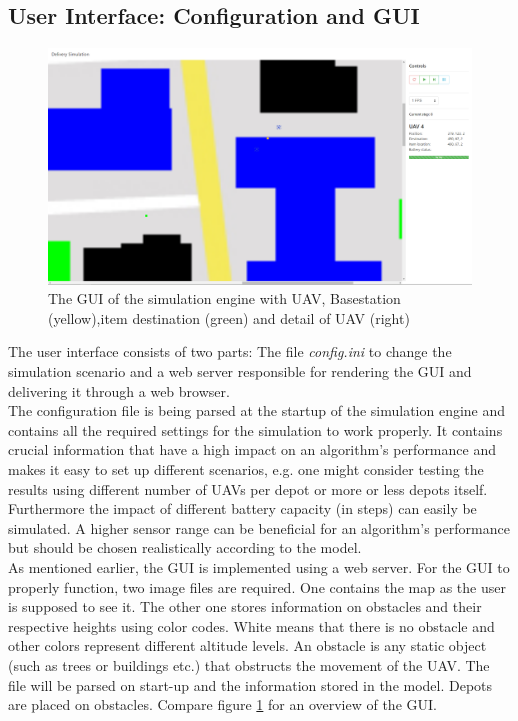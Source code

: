 \subsection{User Interface: Configuration and GUI}
\begin{figure}[htbp]\label{fig:gui}
	\centering
	\includegraphics[width=\textwidth]{images/gui}
	\caption{The GUI of the simulation engine with UAV, Basestation (yellow),item destination (green) and detail of UAV (right)}
\end{figure}
The user interface consists of two parts: The file \textit{config.ini} to change the simulation scenario and a web server responsible for rendering the GUI and delivering it through a web browser.\\
The configuration file is being parsed at the startup of the simulation engine and contains all the required settings for the simulation to work properly. It contains crucial information that have a high impact on an algorithm's performance and makes it easy to set up different scenarios, e.g. one might consider testing the results using different number of UAVs per depot or more or less depots itself.
Furthermore the impact of different battery capacity (in steps) can easily be simulated. A higher sensor range can be beneficial for an algorithm's performance but should be chosen realistically according to the model.\\
As mentioned earlier, the GUI is implemented using a web server. For the GUI to properly function, two image files are required. One contains the map as the user is supposed to see it. The other one stores information on obstacles and their respective heights using color codes. White means that there is no obstacle and other colors represent different altitude levels. An obstacle is any static object (such as trees or buildings etc.) that obstructs the movement of the UAV. The file will be parsed on start-up and the information stored in the model.  Depots are placed on obstacles. Compare figure \ref{fig:gui} for an overview of the GUI.\\
